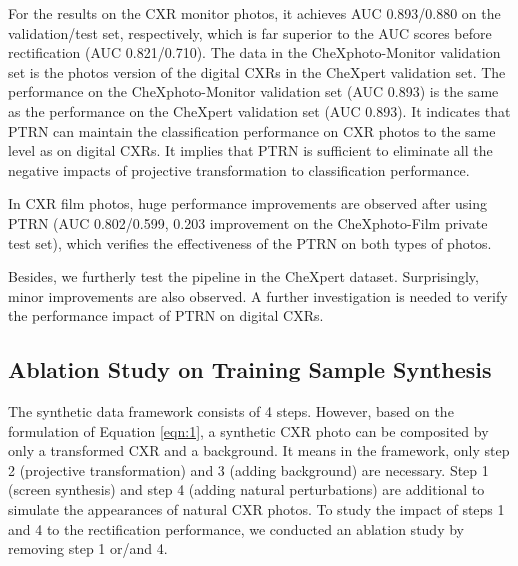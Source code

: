 \documentclass[preprint, 12pt]{elsarticle}
\begin{document}
For the results on the CXR monitor photos, it achieves AUC 0.893/0.880 on the validation/test set, respectively, which is far superior to the AUC scores before rectification (AUC 0.821/0.710). The data in the CheXphoto-Monitor validation set is the photos version of the digital CXRs in the CheXpert validation set. The performance on the CheXphoto-Monitor validation set (AUC 0.893) is the same as the performance on the CheXpert validation set (AUC 0.893). It indicates that PTRN can maintain the classification performance on CXR photos to the same level as on digital CXRs. It implies that PTRN is sufficient to eliminate all the negative impacts of projective transformation to classification performance.

In CXR film photos, huge performance improvements are observed after using PTRN (AUC 0.802/0.599, 0.203 improvement on the CheXphoto-Film private test set), which verifies the effectiveness of the PTRN on both types of photos.

Besides, we furtherly test the pipeline in the CheXpert dataset. Surprisingly, minor improvements are also observed. A further investigation is needed to verify the performance impact of PTRN on digital CXRs.

\subsection{Ablation Study on Training Sample Synthesis} \label{sec: Ablation Study on Training Sample Synthesis}

The synthetic data framework consists of 4 steps. However, based on the formulation of Equation \ref{eqn:1}, a synthetic CXR photo can be composited by only a transformed CXR and a background. It means in the framework, only step 2 (projective transformation) and 3 (adding background) are necessary. Step 1 (screen synthesis) and step 4 (adding natural perturbations) are additional to simulate the appearances of natural CXR photos. To study the impact of steps 1 and 4 to the rectification performance, we conducted an ablation study by removing step 1 or/and 4.
\end{document}
